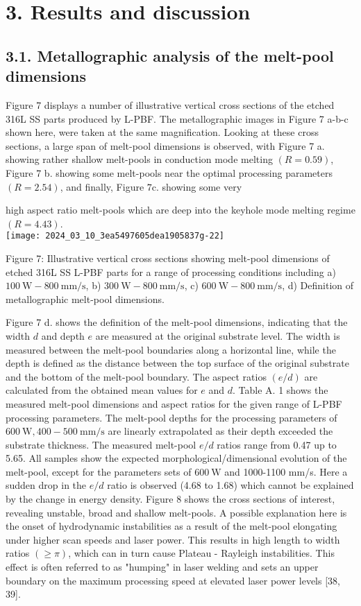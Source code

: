 \documentclass[10pt]{article}
\begin{document}
\section*{3. Results and discussion}
\subsection*{3.1. Metallographic analysis of the melt-pool dimensions}
Figure 7 displays a number of illustrative vertical cross sections of the etched 316L SS parts produced by L-PBF. The metallographic images in Figure 7 a-b-c shown here, were taken at the same magnification. Looking at these cross sections, a large span of melt-pool dimensions is observed, with Figure 7 a. showing rather shallow melt-pools in conduction mode melting $(R=0.59)$, Figure 7 b. showing some melt-pools near the optimal processing parameters $(R=2.54)$, and finally, Figure $7 \mathrm{c}$. showing some very

high aspect ratio melt-pools which are deep into the keyhole mode melting regime $(R=4.43)$.\\
\texttt{[image: 2024\_03\_10\_3ea5497605dea1905837g-22]}

Figure 7: Illustrative vertical cross sections showing melt-pool dimensions of etched 316L SS L-PBF parts for a range of processing conditions including a) $100 \mathrm{~W}-800 \mathrm{~mm} / \mathrm{s}$, b) $300 \mathrm{~W}-800 \mathrm{~mm} / \mathrm{s}$, c) $600 \mathrm{~W}-800 \mathrm{~mm} / \mathrm{s}$, d) Definition of metallographic melt-pool dimensions.

Figure 7 d. shows the definition of the melt-pool dimensions, indicating that the width $d$ and depth $e$ are measured at the original substrate level. The width is measured between the melt-pool boundaries along a horizontal line, while the depth is defined as the distance between the top surface of the original substrate and the bottom of the melt-pool boundary. The aspect ratios $(e / d)$ are calculated from the obtained mean values for $e$ and $d$. Table A. 1 shows the measured melt-pool dimensions and aspect ratios for the given range of L-PBF processing parameters. The melt-pool depths for the processing parameters of $600 \mathrm{~W}, 400-500 \mathrm{~mm} / \mathrm{s}$ are linearly extrapolated as their depth exceeded the substrate thickness. The measured melt-pool $e / d$ ratios range from 0.47 up to 5.65. All samples show the expected morphological/dimensional evolution of the melt-pool, except for the parameters sets of $600 \mathrm{~W}$ and 1000-1100 mm/s. Here a sudden drop in the $e / d$ ratio is observed (4.68 to 1.68) which cannot be explained by the change in energy density. Figure 8 shows the cross sections of interest, revealing unstable, broad and shallow melt-pools. A possible explanation here is the onset of hydrodynamic instabilities as a result of the melt-pool elongating under higher scan speeds and laser power. This results in high length to width ratios $(\geq \pi)$, which can in turn cause Plateau - Rayleigh instabilities. This effect is often referred to as "humping" in laser welding and sets an upper boundary on the maximum processing speed at elevated laser power levels [38, 39].
\end{document}
